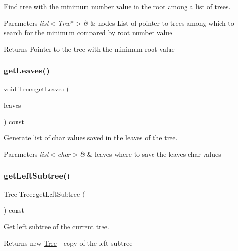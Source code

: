 Find tree with the minimum number value in the root among a list of trees. 


\begin{DoxyParams}{Parameters}
{\em list$<$\+Tree$\ast$$>$\&} & nodes List of pointer to trees among which to search for the minimum compared by root number value \\
\hline
\end{DoxyParams}
\begin{DoxyReturn}{Returns}
Pointer to the tree with the minimum root value 
\end{DoxyReturn}
\mbox{\label{class_tree_ae8d23cf626ec0c79da63d50407027127}} 
\subsubsection{\texorpdfstring{getLeaves()}{getLeaves()}}
{\footnotesize\ttfamily void Tree\+::get\+Leaves (\begin{DoxyParamCaption}\item[{list$<$ char $>$ \&}]{leaves }\end{DoxyParamCaption}) const}



Generate list of char values saved in the leaves of the tree. 


\begin{DoxyParams}{Parameters}
{\em list$<$char$>$\&} & leaves where to save the leaves char values \\
\hline
\end{DoxyParams}
\mbox{\label{class_tree_a768a4e55608dd9e86a21801de9047128}} 
\subsubsection{\texorpdfstring{getLeftSubtree()}{getLeftSubtree()}}
{\footnotesize\ttfamily \mbox{\hyperlink{class_tree}{Tree}} Tree\+::get\+Left\+Subtree (\begin{DoxyParamCaption}{ }\end{DoxyParamCaption}) const}



Get left subtree of the current tree. 

\begin{DoxyReturn}{Returns}
new \mbox{\hyperlink{class_tree}{Tree}} -\/ copy of the left subtree 
\end{DoxyReturn}
\mbox{\label{class_tree_a497e24d0d17e19918a50146ad5f8bf03}} 
